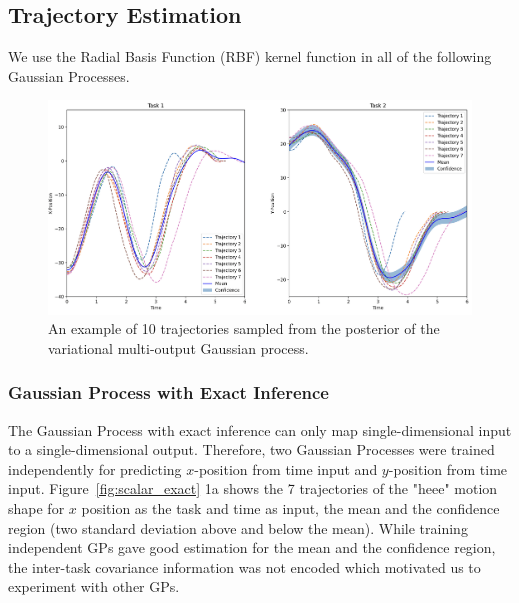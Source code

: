 \subsection{Trajectory Estimation}
We use the Radial Basis Function (RBF) kernel function in all of the following Gaussian Processes.

\begin{figure}[t!]
    \captionsetup{font=footnotesize}
    \centering
    \includegraphics[width=\textwidth]{paper/images/Multi_Exact_GP.png}
    \caption{An example of 10 trajectories sampled from the posterior of the variational multi-output Gaussian process.}
    \label{fig:multitask_exact}
    \vspace{-2em}
\end{figure}

\subsubsection{Gaussian Process with Exact Inference}
The Gaussian Process with exact inference can only map single-dimensional input to a single-dimensional output. Therefore, two Gaussian Processes were trained independently for predicting $x$-position from time input and $y$-position from time input. Figure~\ref{fig:scalar_exact} 1a shows the 7 trajectories of the "heee" motion shape for $x$ position as the task and time as input, the mean and the confidence region (two standard deviation above and below the mean). While training independent GPs gave good estimation for the mean and the confidence region, the inter-task covariance information was not encoded which motivated us to experiment with other GPs.

